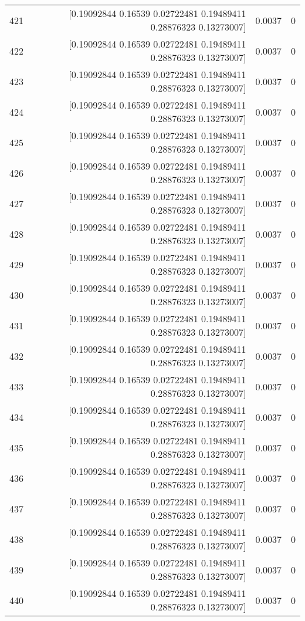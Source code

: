 \begin{longtable}{lrrr}
421 & [0.19092844 0.16539    0.02722481 0.19489411 0.28876323 0.13273007] & 0.0037 & 0 \\
422 & [0.19092844 0.16539    0.02722481 0.19489411 0.28876323 0.13273007] & 0.0037 & 0 \\
423 & [0.19092844 0.16539    0.02722481 0.19489411 0.28876323 0.13273007] & 0.0037 & 0 \\
424 & [0.19092844 0.16539    0.02722481 0.19489411 0.28876323 0.13273007] & 0.0037 & 0 \\
425 & [0.19092844 0.16539    0.02722481 0.19489411 0.28876323 0.13273007] & 0.0037 & 0 \\
426 & [0.19092844 0.16539    0.02722481 0.19489411 0.28876323 0.13273007] & 0.0037 & 0 \\
427 & [0.19092844 0.16539    0.02722481 0.19489411 0.28876323 0.13273007] & 0.0037 & 0 \\
428 & [0.19092844 0.16539    0.02722481 0.19489411 0.28876323 0.13273007] & 0.0037 & 0 \\
429 & [0.19092844 0.16539    0.02722481 0.19489411 0.28876323 0.13273007] & 0.0037 & 0 \\
430 & [0.19092844 0.16539    0.02722481 0.19489411 0.28876323 0.13273007] & 0.0037 & 0 \\
431 & [0.19092844 0.16539    0.02722481 0.19489411 0.28876323 0.13273007] & 0.0037 & 0 \\
432 & [0.19092844 0.16539    0.02722481 0.19489411 0.28876323 0.13273007] & 0.0037 & 0 \\
433 & [0.19092844 0.16539    0.02722481 0.19489411 0.28876323 0.13273007] & 0.0037 & 0 \\
434 & [0.19092844 0.16539    0.02722481 0.19489411 0.28876323 0.13273007] & 0.0037 & 0 \\
435 & [0.19092844 0.16539    0.02722481 0.19489411 0.28876323 0.13273007] & 0.0037 & 0 \\
436 & [0.19092844 0.16539    0.02722481 0.19489411 0.28876323 0.13273007] & 0.0037 & 0 \\
437 & [0.19092844 0.16539    0.02722481 0.19489411 0.28876323 0.13273007] & 0.0037 & 0 \\
438 & [0.19092844 0.16539    0.02722481 0.19489411 0.28876323 0.13273007] & 0.0037 & 0 \\
439 & [0.19092844 0.16539    0.02722481 0.19489411 0.28876323 0.13273007] & 0.0037 & 0 \\
440 & [0.19092844 0.16539    0.02722481 0.19489411 0.28876323 0.13273007] & 0.0037 & 0 \\

\end{longtable}
